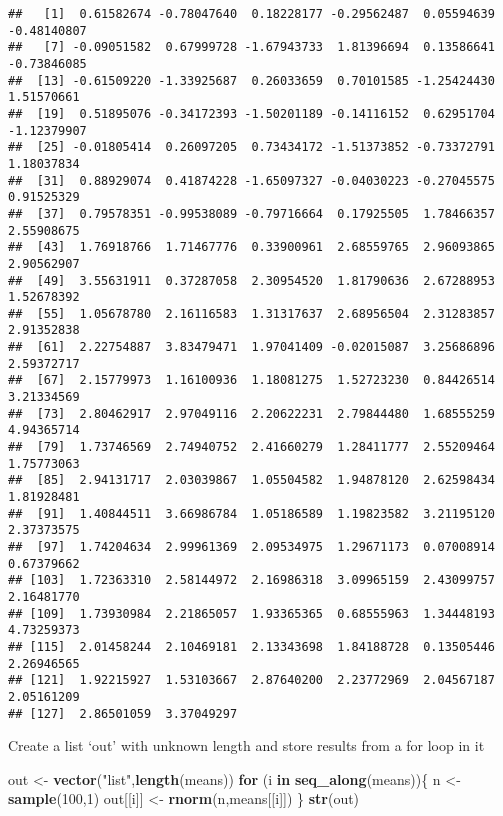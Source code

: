 \documentclass[
]{article}
\newenvironment{Shaded}{\begin{snugshade}}{\end{snugshade}}
\newcommand{\ControlFlowTok}[1]{\textcolor[rgb]{0.13,0.29,0.53}{\textbf{#1}}}
\newcommand{\DecValTok}[1]{\textcolor[rgb]{0.00,0.00,0.81}{#1}}
\newcommand{\FunctionTok}[1]{\textcolor[rgb]{0.13,0.29,0.53}{\textbf{#1}}}
\newcommand{\NormalTok}[1]{#1}
\newcommand{\OtherTok}[1]{\textcolor[rgb]{0.56,0.35,0.01}{#1}}
\newcommand{\StringTok}[1]{\textcolor[rgb]{0.31,0.60,0.02}{#1}}
\begin{document}
\begin{verbatim}
##   [1]  0.61582674 -0.78047640  0.18228177 -0.29562487  0.05594639 -0.48140807
##   [7] -0.09051582  0.67999728 -1.67943733  1.81396694  0.13586641 -0.73846085
##  [13] -0.61509220 -1.33925687  0.26033659  0.70101585 -1.25424430  1.51570661
##  [19]  0.51895076 -0.34172393 -1.50201189 -0.14116152  0.62951704 -1.12379907
##  [25] -0.01805414  0.26097205  0.73434172 -1.51373852 -0.73372791  1.18037834
##  [31]  0.88929074  0.41874228 -1.65097327 -0.04030223 -0.27045575  0.91525329
##  [37]  0.79578351 -0.99538089 -0.79716664  0.17925505  1.78466357  2.55908675
##  [43]  1.76918766  1.71467776  0.33900961  2.68559765  2.96093865  2.90562907
##  [49]  3.55631911  0.37287058  2.30954520  1.81790636  2.67288953  1.52678392
##  [55]  1.05678780  2.16116583  1.31317637  2.68956504  2.31283857  2.91352838
##  [61]  2.22754887  3.83479471  1.97041409 -0.02015087  3.25686896  2.59372717
##  [67]  2.15779973  1.16100936  1.18081275  1.52723230  0.84426514  3.21334569
##  [73]  2.80462917  2.97049116  2.20622231  2.79844480  1.68555259  4.94365714
##  [79]  1.73746569  2.74940752  2.41660279  1.28411777  2.55209464  1.75773063
##  [85]  2.94131717  2.03039867  1.05504582  1.94878120  2.62598434  1.81928481
##  [91]  1.40844511  3.66986784  1.05186589  1.19823582  3.21195120  2.37373575
##  [97]  1.74204634  2.99961369  2.09534975  1.29671173  0.07008914  0.67379662
## [103]  1.72363310  2.58144972  2.16986318  3.09965159  2.43099757  2.16481770
## [109]  1.73930984  2.21865057  1.93365365  0.68555963  1.34448193  4.73259373
## [115]  2.01458244  2.10469181  2.13343698  1.84188728  0.13505446  2.26946565
## [121]  1.92215927  1.53103667  2.87640200  2.23772969  2.04567187  2.05161209
## [127]  2.86501059  3.37049297
\end{verbatim}

Create a list `out' with unknown length and store results from a for
loop in it

\begin{Shaded}
\begin{Highlighting}[]
\NormalTok{out }\OtherTok{\textless{}{-}} \FunctionTok{vector}\NormalTok{(}\StringTok{"list"}\NormalTok{,}\FunctionTok{length}\NormalTok{(means))}
\ControlFlowTok{for}\NormalTok{ (i }\ControlFlowTok{in} \FunctionTok{seq\_along}\NormalTok{(means))\{}
\NormalTok{  n }\OtherTok{\textless{}{-}} \FunctionTok{sample}\NormalTok{(}\DecValTok{100}\NormalTok{,}\DecValTok{1}\NormalTok{)}
\NormalTok{  out[[i]] }\OtherTok{\textless{}{-}} \FunctionTok{rnorm}\NormalTok{(n,means[[i]])}
\NormalTok{\}}
\FunctionTok{str}\NormalTok{(out)}
\end{Highlighting}
\end{Shaded}
\end{document}
